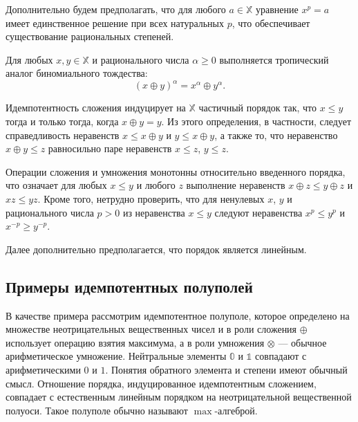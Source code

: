 \documentclass[specialist,
               substylefile = spbu.rtx,
               subf,href,colorlinks=true, 12pt]{disser}
\theoremstyle{definition}
\begin{document}
Дополнительно будем предполагать, что для любого $a\in\mathbb{X}$ уравнение $x^{p}=a$ имеет единственное решение при всех натуральных $p$, что обеспечивает существование рациональных степеней. 

Для любых $x,y\in\mathbb{X}$ и рационального числа $\alpha\geq 0$ выполняется тропический аналог биномиального тождества: 
\begin{equation*}
(x\oplus y)^{\alpha}=x^{\alpha}\oplus y^{\alpha}.
\end{equation*}

Идемпотентность сложения индуцирует на $\mathbb{X}$ частичный порядок так, что $x\leq y$ тогда и только тогда, когда $x\oplus y=y$. Из этого определения, в частности, следует справедливость неравенств $x\leq x\oplus y$ и $y\leq x\oplus y$, а также то, что неравенство $x\oplus y\leq z$ равносильно паре неравенств  $x\leq z$, $y\leq z$.

 Операции сложения и умножения монотонны относительно введенного порядка, что означает для любых $x\leq y$ и любого $z$ выполнение неравенств $x\oplus z\leq y\oplus z$ и $xz\leq yz$. 
 Кроме того, нетрудно проверить, что для ненулевых $x$, $y$ и рационального числа $p>0$ из неравенства $x\leq y$ следуют неравенства $x^{p}\leq y^{p}$ и $x^{-p}\geq y^{-p}$. 
 
Далее дополнительно предполагается, что порядок является линейным.
 

\subsection{Примеры идемпотентных полуполей}
В качестве примера рассмотрим идемпотентное полуполе, которое определено на множестве неотрицательных вещественных чисел и в роли сложения $\oplus$ использует операцию взятия максимума, а в роли умножения $\otimes$ --- обычное арифметическое умножение. Нейтральные элементы $\mathbb{0}$ и $\mathbb{1}$ совпадают с арифметическими $0$ и $1$. Понятия обратного элемента и степени имеют обычный смысл. 
Отношение порядка, индуцированное идемпотентным сложением, совпадает с естественным линейным порядком на неотрицательной вещественной полуоси.
Такое полуполе обычно называют $\max$-алгеброй. 
\end{document}
